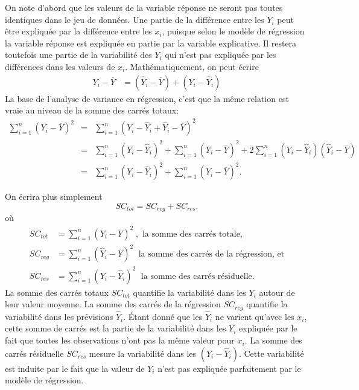 On note d'abord que les valeurs de la variable réponse ne seront pas toutes identiques dans le jeu de données. Une partie de la différence entre les $Y_i$ peut être expliquée par la différence entre les $x_i$, puisque selon le modèle de régression la variable réponse est expliquée en partie par la variable explicative. Il restera toutefois une partie de la variabilité des $Y_i$ qui n'est pas expliquée par les différences dans les valeurs de $x_i$. Mathématiquement, on peut écrire
\begin{align*}
Y_i - \overline{Y} &= (\hat{Y}_i - \overline{Y})  +  (Y_i - \hat{Y}_i)
\end{align*}
La base de l'analyse de variance en régression, c'est que la même relation est vraie au niveau de la somme des carrés totaux:
\begin{eqnarray*}
  \sum_{i=1}^n (Y_i-\overline{Y})^2 & = & \sum_{i=1}^n (Y_i - \hat{Y}_i + \hat{Y}_i - \overline{Y})^2\\
 &=&  \sum_{i=1}^n (Y_i - \hat{Y}_i)^2 + \sum_{i=1}^n(\hat{Y}_i - \overline{Y})^2 + 2\sum_{i=1}^n (Y_i-\hat{Y}_i)(\hat{Y}_i-\overline{Y})\\
 &=&  \sum_{i=1}^n (Y_i - \hat{Y}_i)^2 + \sum_{i=1}^n(\hat{Y}_i - \overline{Y})^2.
\end{eqnarray*}

\vspace{-0.05 in}
On écrira plus simplement
\begin{equation}\label{eq:decompvar}
SC_{tot}=SC_{reg}+SC_{res}.
\end{equation}
o\`u
\vspace{-0.05 in}
\begin{align*}
SC_{tot}& =\sum_{i=1}^n(Y_i-\overline{Y})^2 \; , \mbox{ la somme des carrés totale}, \\
SC_{reg} & =\sum_{i=1}^n(\hat{Y}_i-\overline{Y})^2 \; \mbox{ la somme des carrés de la régression, et}\\
SC_{res}&=\sum_{i=1}^n(Y_i-\hat{Y}_i)^2 \; \mbox{ la somme des carrés résiduelle.}
\end{align*}
La somme des carr\'es totaux $SC_{tot}$ quantifie la variabilit\'e dans les $Y_i$ autour de leur valeur moyenne.  La somme des carrés de la régression $SC_{reg}$ quantifie la variabilit\'e dans les prévisions $\hat{Y}_i$. Étant donné que les $\hat{Y}_i$ ne varient qu'avec les $x_i$, cette somme de carrés est la partie de la variabilit\'e dans les $Y_i$ expliqu\'ee par le fait que toutes les observations n'ont pas la m\^eme valeur pour $x_i$. La somme  des carrés résiduelle $SC_{res}$ mesure la variabilit\'e dans les $(Y_i-\hat{Y}_i)$. Cette variabilit\'e est induite par le fait que la valeur de $Y_i$ n'est pas expliqu\'ee parfaitement par le mod\`ele de
r\'egression.

